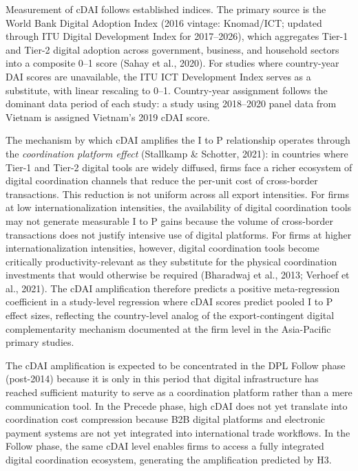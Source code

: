 \documentclass[
  12pt,a4paper]{article}
\begin{document}
Measurement of cDAI follows established indices. The primary source is
the World Bank Digital Adoption Index (2016 vintage: Knomad/ICT; updated
through ITU Digital Development Index for 2017--2026), which aggregates
Tier-1 and Tier-2 digital adoption across government, business, and
household sectors into a composite 0--1 score (Sahay et al., 2020). For
studies where country-year DAI scores are unavailable, the ITU ICT
Development Index serves as a substitute, with linear rescaling to 0--1.
Country-year assignment follows the dominant data period of each study:
a study using 2018--2020 panel data from Vietnam is assigned Vietnam's
2019 cDAI score.

The mechanism by which cDAI amplifies the I to P relationship operates
through the \emph{coordination platform effect} (Stallkamp \& Schotter,
2021): in countries where Tier-1 and Tier-2 digital tools are widely
diffused, firms face a richer ecosystem of digital coordination channels
that reduce the per-unit cost of cross-border transactions. This
reduction is not uniform across all export intensities. For firms at low
internationalization intensities, the availability of digital
coordination tools may not generate measurable I to P gains because the
volume of cross-border transactions does not justify intensive use of
digital platforms. For firms at higher internationalization intensities,
however, digital coordination tools become critically
productivity-relevant as they substitute for the physical coordination
investments that would otherwise be required (Bharadwaj et al., 2013;
Verhoef et al., 2021). The cDAI amplification therefore predicts a
positive meta-regression coefficient in a study-level regression where
cDAI scores predict pooled I to P effect sizes, reflecting the
country-level analog of the export-contingent digital complementarity
mechanism documented at the firm level in the Asia-Pacific primary
studies.

The cDAI amplification is expected to be concentrated in the DPL Follow
phase (post-2014) because it is only in this period that digital
infrastructure has reached sufficient maturity to serve as a
coordination platform rather than a mere communication tool. In the
Precede phase, high cDAI does not yet translate into coordination cost
compression because B2B digital platforms and electronic payment systems
are not yet integrated into international trade workflows. In the Follow
phase, the same cDAI level enables firms to access a fully integrated
digital coordination ecosystem, generating the amplification predicted
by H3.
\end{document}
